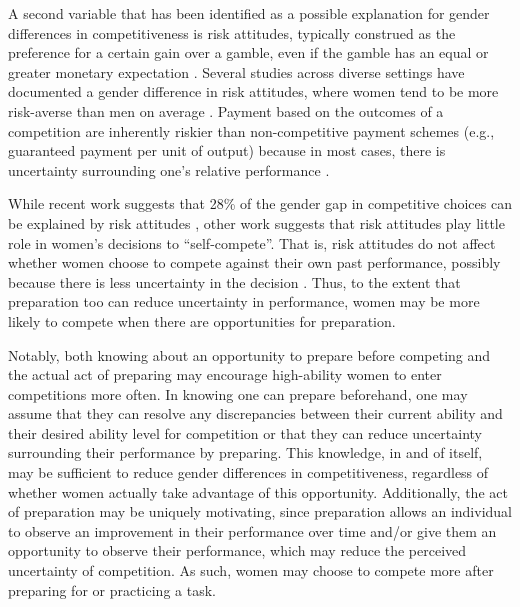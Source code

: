 \documentclass[a4paper, nobind]{templates/ociamthesis}
\begin{document}
A second variable that has been identified as a possible explanation for gender differences in competitiveness is risk attitudes, typically construed as the preference for a certain gain over a gamble, even if the gamble has an equal or greater monetary expectation \autocite{Kahneman1982}. Several studies across diverse settings have documented a gender difference in risk attitudes, where women tend to be more risk-averse than men on average \autocite{Bertrand2010a,Croson2009,Apicella2017}. Payment based on the outcomes of a competition are inherently riskier than non-competitive payment schemes (e.g., guaranteed payment per unit of output) because in most cases, there is uncertainty surrounding one's relative performance \autocite{Niederle2011}.

While recent work suggests that 28\% of the gender gap in competitive choices can be explained by risk attitudes \autocite{Gillen2019,Veldhuizen2017}, other work suggests that risk attitudes play little role in women's decisions to ``self-compete''. That is, risk attitudes do not affect whether women choose to compete against their own past performance, possibly because there is less uncertainty in the decision \autocite{Apicella2017a}. Thus, to the extent that preparation too can reduce uncertainty in performance, women may be more likely to compete when there are opportunities for preparation.

Notably, both knowing about an opportunity to prepare before competing and the actual act of preparing may encourage high-ability women to enter competitions more often. In knowing one can prepare beforehand, one may assume that they can resolve any discrepancies between their current ability and their desired ability level for competition or that they can reduce uncertainty surrounding their performance by preparing. This knowledge, in and of itself, may be sufficient to reduce gender differences in competitiveness, regardless of whether women actually take advantage of this opportunity. Additionally, the act of preparation may be uniquely motivating, since preparation allows an individual to observe an improvement in their performance over time and/or give them an opportunity to observe their performance, which may reduce the perceived uncertainty of competition. As such, women may choose to compete more after preparing for or practicing a task.
\end{document}
